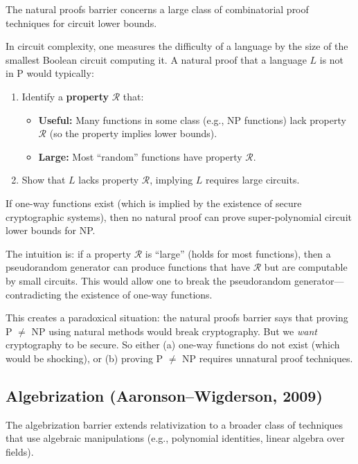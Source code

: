 The natural proofs barrier concerns a large class of combinatorial proof techniques for circuit lower bounds.

In circuit complexity, one measures the difficulty of a language by the size of the smallest Boolean circuit computing it. A natural proof that a language $L$ is not in P would typically:
\begin{enumerate}
  \item Identify a \textbf{property} $\mathcal{R}$ that:
    \begin{itemize}
      \item \textbf{Useful:} Many functions in some class (e.g., NP functions) lack property $\mathcal{R}$ (so the property implies lower bounds).
      \item \textbf{Large:} Most ``random'' functions have property $\mathcal{R}$.
    \end{itemize}
  \item Show that $L$ lacks property $\mathcal{R}$, implying $L$ requires large circuits.
\end{enumerate}

\begin{theorem}
If one-way functions exist (which is implied by the existence of secure cryptographic systems), then no natural proof can prove super-polynomial circuit lower bounds for NP.
\end{theorem}

The intuition is: if a property $\mathcal{R}$ is ``large'' (holds for most functions), then a pseudorandom generator can produce functions that have $\mathcal{R}$ but are computable by small circuits. This would allow one to break the pseudorandom generator---contradicting the existence of one-way functions.

\begin{remark}
This creates a paradoxical situation: the natural proofs barrier says that proving P $\neq$ NP using natural methods would break cryptography. But we \emph{want} cryptography to be secure. So either (a) one-way functions do not exist (which would be shocking), or (b) proving P $\neq$ NP requires unnatural proof techniques.
\end{remark}

\subsection{Algebrization (Aaronson--Wigderson, 2009)}

The algebrization barrier extends relativization to a broader class of techniques that use algebraic manipulations (e.g., polynomial identities, linear algebra over fields).

